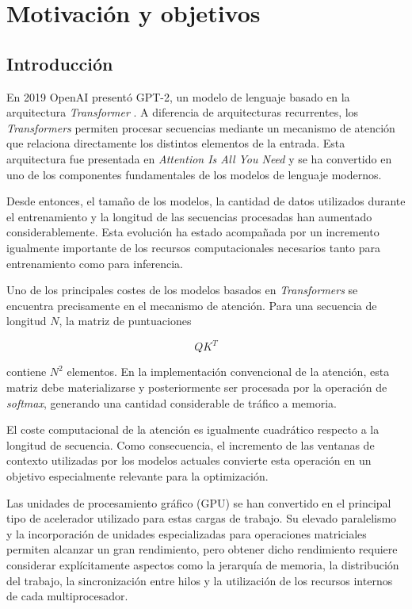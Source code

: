 \chapter{Motivación y objetivos}

\section{Introducción}

En 2019 OpenAI presentó GPT-2, un modelo de lenguaje basado en la arquitectura \textit{Transformer} \cite{radford2019gpt2}. A diferencia de arquitecturas recurrentes, los \textit{Transformers} permiten procesar secuencias mediante un mecanismo de atención que relaciona directamente los distintos elementos de la entrada. Esta arquitectura fue presentada en \textit{Attention Is All You Need} \cite{vaswani2017attention} y se ha convertido en uno de los componentes fundamentales de los modelos de lenguaje modernos.

Desde entonces, el tamaño de los modelos, la cantidad de datos utilizados durante el entrenamiento y la longitud de las secuencias procesadas han aumentado considerablemente. Esta evolución ha estado acompañada por un incremento igualmente importante de los recursos computacionales necesarios tanto para entrenamiento como para inferencia.

Uno de los principales costes de los modelos basados en \textit{Transformers} se encuentra precisamente en el mecanismo de atención. Para una secuencia de longitud \(N\), la matriz de puntuaciones

$$
QK^T
$$

contiene \(N^2\) elementos. En la implementación convencional de la atención, esta matriz debe materializarse y posteriormente ser procesada por la operación de \textit{softmax}, generando una cantidad considerable de tráfico a memoria.

El coste computacional de la atención es igualmente cuadrático respecto a la longitud de secuencia. Como consecuencia, el incremento de las ventanas de contexto utilizadas por los modelos actuales convierte esta operación en un objetivo especialmente relevante para la optimización.

Las unidades de procesamiento gráfico (GPU) se han convertido en el principal tipo de acelerador utilizado para estas cargas de trabajo. Su elevado paralelismo y la incorporación de unidades especializadas para operaciones matriciales permiten alcanzar un gran rendimiento, pero obtener dicho rendimiento requiere considerar explícitamente aspectos como la jerarquía de memoria, la distribución del trabajo, la sincronización entre hilos y la utilización de los recursos internos de cada multiprocesador.

